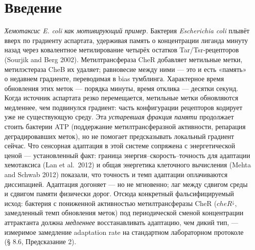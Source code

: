 \documentclass[pdflatex,sn-mathphys-ay]{sn-jnl}
\begin{document}
\maketitle

\section{Введение}\label{ux432ux432ux435ux434ux435ux43dux438ux435}



\emph{Хемотаксис E. coli как мотивирующий пример.} Бактерия \emph{Escherichia coli} плывёт вверх по градиенту аспартата, удерживая память о концентрации лиганда минуту назад через ковалентное метилирование четырёх остатков Tar/Tsr-рецепторов (Sourjik and Berg 2002). Метилтрансфераза CheR добавляет метильные метки, метилэстераза CheB их удаляет; равновесие между ними --- это и есть «память» о недавнем градиенте, переводимая в bias тумблинга. Характерное время обновления этих меток --- порядка минуты, время отклика --- десятки секунд. Когда источник аспартата резко перемещается, метильные метки обновляются медленнее, чем подвинулся градиент: часть конфигурации рецепторов кодирует уже не существующую среду. Эта \emph{устаревшая фракция памяти} продолжает стоить бактерии ATP (поддержание метилтрансферазной активности, репарация деградировавших меток), но не помогает предсказывать локальный градиент сейчас. Что сенсорная адаптация в этой системе сопряжена с энергетической ценой --- установленный факт: граница энергия--скорость--точность для адаптации хемотаксиса (Lan et al.~2012) и общая энергетика клеточного вычисления (Mehta and Schwab 2012) показали, что точность и темп адаптации оплачиваются диссипацией. Адаптация догоняет --- но не мгновенно; лаг между сдвигом среды и сдвигом памяти физически дорог. Отсюда конкретный фальсифицируемый исход: бактерия с пониженной активностью метилтрансферазы CheR (\(cheR^{\downarrow}\), замедленный темп обновления меток) под периодической сменой концентрации аттрактанта должна \emph{медленнее} восстанавливать адаптацию, чем дикий тип, --- измеримое замедление adaptation rate на стандартном лабораторном протоколе (§ 8.6, Предсказание 2).
\end{document}
